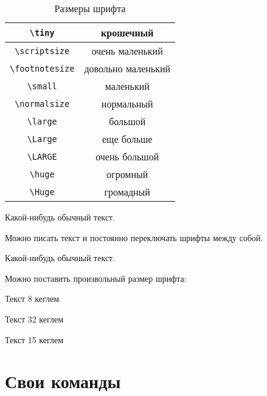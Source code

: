 \documentclass[12pt, a4paper]{article}
\begin{document}
\begin{table}[h!]
	\caption{Размеры шрифта}
	\centering
		\begin{tabular}{|c|c|}
		\hline	\verb|\tiny|      & \tiny        крошечный \\
		\hline	\verb|\scriptsize|   & \scriptsize  очень маленький\\
			\hline \verb|\footnotesize| & \footnotesize  довольно маленький \\
			\hline \verb|\small|        &  \small        маленький \\
			\hline \verb|\normalsize|   &  \normalsize  нормальный \\
			\hline \verb|\large|        &  \large       большой \\
			\hline \verb|\Large|        &  \Large       еще больше \\[5pt]
			\hline \verb|\LARGE|        &  \LARGE       очень большой \\[5pt]
			\hline \verb|\huge|         &  \huge        огромный \\[5pt]
			\hline \verb|\Huge|         &  \Huge        громадный \\ \hline
		\end{tabular}
\end{table}

\begin{Huge}
Какой-нибудь обычный текст.
\end{Huge}

\vspace{1cm}

Можно писать текст и \LARGE постоянно переключать \tiny шрифты между \normalsize собой.

\vspace{1cm}

{ \Huge  Какой-нибудь обычный текст. }

\vspace{1cm}

Можно поставить произвольный размер шрифта:


{ \fontsize{8}{1.33}\selectfont Текст 8 кеглем}

{ \fontsize{32}{1.33}\selectfont Текст 32 кеглем}

{ \fontsize{15}{1.33}\selectfont Текст 15 кеглем}

\section{Свои команды} 
\end{document}
